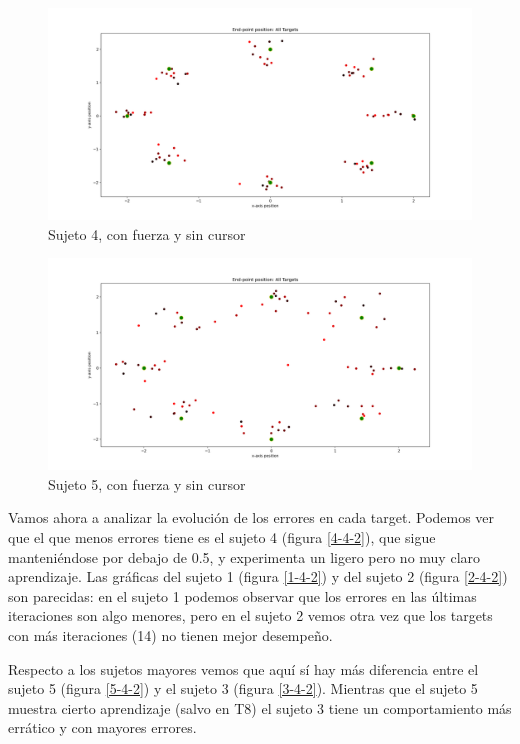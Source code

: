 \documentclass[a4paper,11pt, oneside]{book}
\begin{document}
\begin{figure}[H]
	\includegraphics[width=\linewidth]{sujeto4/force_no_cursor/trayectorias_puntos}
	\caption{Sujeto 4, con  fuerza y sin cursor}
	\label{4-4-1}
\end{figure}
\begin{figure}[H]
	\includegraphics[width=\linewidth]{sujeto5/force_no_cursor/trayectorias_puntos}
	\caption{Sujeto 5, con  fuerza y sin cursor}
	\label{5-4-1}
\end{figure}


Vamos ahora a analizar la evolución de los errores en cada target. Podemos ver que el que menos errores tiene es el sujeto 4 (figura \ref{4-4-2}), que sigue manteniéndose por debajo de 0.5, y experimenta un ligero pero no muy claro aprendizaje. Las gráficas del sujeto 1  (figura \ref{1-4-2}) y del sujeto 2 (figura \ref{2-4-2}) son parecidas: en el sujeto 1 podemos observar que los errores en las últimas iteraciones son algo menores, pero en el sujeto 2 vemos otra vez que los targets con más iteraciones (14) no tienen mejor desempeño. 

Respecto a los sujetos mayores vemos que aquí sí hay más diferencia entre el sujeto 5 (figura \ref{5-4-2}) y el sujeto 3 (figura \ref{3-4-2}). Mientras que el sujeto 5 muestra cierto aprendizaje (salvo en T8) el sujeto 3 tiene un comportamiento más errático y con mayores errores.
\end{document}
